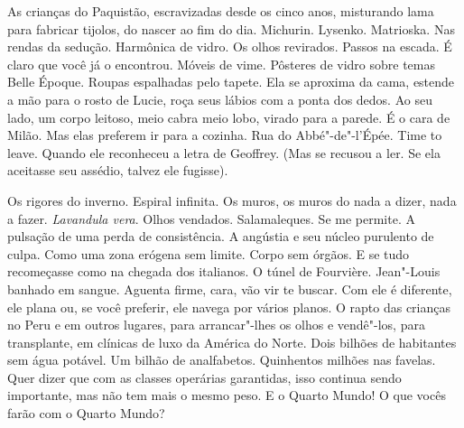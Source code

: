 As crianças do Paquistão, escravizadas desde os cinco anos, misturando
lama para fabricar tijolos, do nascer ao fim do dia. Michurin. Lysenko.
Matrioska. Nas rendas da sedução. Harmônica de vidro. Os olhos
revirados. Passos na escada. É claro que você já o encontrou. Móveis de
vime. Pôsteres de vidro sobre temas Belle Époque. Roupas espalhadas pelo
tapete. Ela se aproxima da cama, estende a mão para o rosto de Lucie,
roça seus lábios com a ponta dos dedos. Ao seu lado, um corpo leitoso,
meio cabra meio lobo, virado para a parede. É o cara de Milão. Mas elas
preferem ir para a cozinha. Rua do Abbé"-de"-l'Épée. Time to leave. Quando
ele reconheceu a letra de Geoffrey. (Mas se recusou a ler. Se ela
aceitasse seu assédio, talvez ele fugisse). %

Os rigores do inverno. Espiral infinita. Os muros, os muros do nada a
dizer, nada a fazer. \emph{Lavandula vera}. Olhos vendados.
Salamaleques. Se me permite. A pulsação de uma perda de consistência. A
angústia e seu núcleo purulento de culpa. Como uma zona erógena sem
limite. Corpo sem órgãos. E se tudo recomeçasse como na chegada dos
italianos. O túnel de Fourvière. Jean"-Louis banhado em sangue. Aguenta
firme, cara, vão vir te buscar. Com ele é diferente, ele plana ou, se
você preferir, ele navega por vários planos. O rapto das crianças no
Peru e em outros lugares, para arrancar"-lhes os olhos e vendê"-los, para
transplante, em clínicas de luxo da América do Norte. Dois bilhões de
habitantes sem água potável. Um bilhão de analfabetos. Quinhentos
milhões nas favelas. Quer dizer que com as classes operárias garantidas,
isso continua sendo importante, mas não tem mais o mesmo peso. E o
Quarto Mundo! O que vocês farão com o Quarto Mundo?

